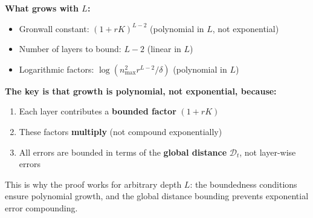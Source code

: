 \textbf{What grows with $L$:}
\begin{itemize}
\item Gronwall constant: $(1+rK)^{L-2}$ (polynomial in $L$, not exponential)
\item Number of layers to bound: $L-2$ (linear in $L$)
\item Logarithmic factors: $\log(n_{\max}^2 r^{L-2}/\delta)$ (polynomial in $L$)
\end{itemize}

\textbf{The key is that growth is polynomial, not exponential, because:}
\begin{enumerate}
\item Each layer contributes a \textbf{bounded factor} $(1+rK)$
\item These factors \textbf{multiply} (not compound exponentially)
\item All errors are bounded in terms of the \textbf{global distance} $\mathscr{D}_t$, not layer-wise errors
\end{enumerate}

This is why the proof works for arbitrary depth $L$: the boundedness conditions ensure polynomial growth, and the global distance bounding prevents exponential error compounding.
